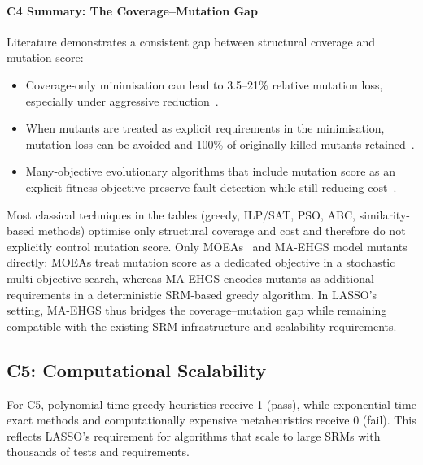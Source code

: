 \begin{appendices}
\paragraph*{C4 Summary: The Coverage--Mutation Gap}

Literature demonstrates a consistent gap between structural coverage and mutation score:

\begin{itemize}
  \item Coverage-only minimisation can lead to 3.5--21\% relative mutation loss, especially under aggressive reduction~\cite{noemmer2020}.
  \item When mutants are treated as explicit requirements in the minimisation, mutation loss can be avoided and 100\% of originally killed mutants retained~\cite{jehan2023}.
  \item Many-objective evolutionary algorithms that include mutation score as an explicit fitness objective preserve fault detection while still reducing cost~\cite{wei2017}.
\end{itemize}

Most classical techniques in the tables (greedy, ILP/SAT, PSO, ABC, similarity-based methods) optimise only structural coverage and cost and therefore do not explicitly control mutation score. Only MOEAs~\cite{wei2017} and MA-EHGS model mutants directly: MOEAs treat mutation score as a dedicated objective in a stochastic multi-objective search, whereas MA-EHGS encodes mutants as additional requirements in a deterministic SRM-based greedy algorithm. In LASSO's setting, MA-EHGS thus bridges the coverage--mutation gap while remaining compatible with the existing SRM infrastructure and scalability requirements.

\subsection{C5: Computational Scalability}\label{app:c5}

For C5, polynomial-time greedy heuristics receive 1 (pass), while exponential-time exact methods and computationally expensive metaheuristics receive 0 (fail). This reflects LASSO's requirement for algorithms that scale to large SRMs with thousands of tests and requirements.


\end{appendices}
